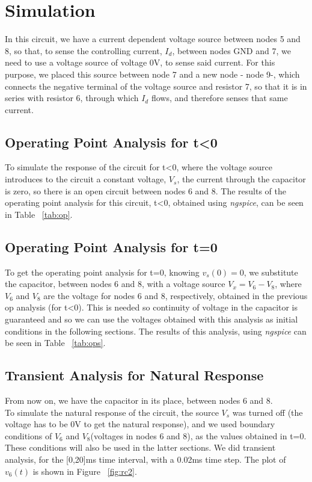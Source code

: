\section{Simulation}
\label{sec:simulation}
In this circuit, we have a current dependent voltage source between nodes 5 and 8, so that, to sense the controlling current, $I_d$, between nodes GND and 7, we need to use a voltage source of voltage 0V, to sense said current. For this purpose, we placed this source between node 7 and a new node - node 9-, which connects the negative terminal of the voltage source and resistor 7, so that it is in series with resistor 6, through which $I_d$ flows, and therefore senses that same current.\\
\subsection{Operating Point Analysis for t\textless0}
To simulate the response of the circuit for t\textless0, where the voltage source introduces to the circuit a constant voltage, $V_s$, the current through the capacitor is zero, so there is an open circuit between nodes 6 and 8. The results of the operating point analysis for this circuit, t\textless0, obtained using \textit{ngspice}, can be seen in Table ~\ref{tab:op}.\\

\subsection{Operating Point Analysis for t=0}
To get the operating point analysis for t=0, knowing $v_s(0)=0$, we substitute the capacitor, between nodes 6 and 8, with a voltage source $V_x=V_6-V_8$, where $V_6$ and $V_8$ are the voltage for nodes 6 and 8, respectively, obtained in the previous op analysis (for t\textless0). This is needed so continuity of voltage in the capacitor is guaranteed and so we can use the voltages obtained with this analysis as initial conditions in the following sections. The results of this analysis, using \textit{ngspice} can be seen in Table ~\ref{tab:ops}.\\
\subsection{Transient Analysis for Natural Response}
From now on, we have the capacitor in its place, between nodes 6 and 8.\\
To simulate the natural response of the circuit, the source $V_s$ was turned off (the voltage has to be 0V to get the natural response), and we used boundary conditions of $V_6$ and $V_8$(voltages in nodes 6 and 8), as the values obtained in t=0. These conditions will also be used in the latter sections. We did transient analysis, for the [0,20]ms time interval, with a 0.02ms time step. The plot of $v_{6}(t)$ is shown in Figure ~\ref{fig:rc2}.\\
